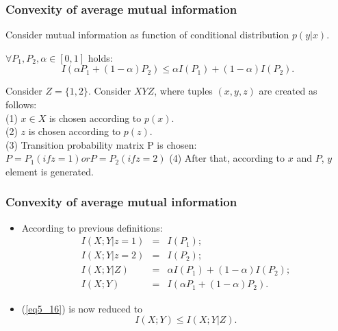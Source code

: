 \documentclass[14pt]{beamer}
\begin{document}
\begin{frame}
\frametitle{Convexity of average mutual information}
\begin{itemize}
\small{

    \item Consider mutual information as function of conditional distribution $p(y|x)$.
    
    \item $\forall P_1, P_2, \alpha \in [0,1]$ holds:
    \begin{equation}
        \label{eq5_16} I\left( {\alpha P_1 + (1 - \alpha )P_2 } \right)
        \le \alpha I(P_1 ) + (1 - \alpha )I(P_2 ).
    \end{equation}

    \item Consider $Z=\{1,2\}$. Consider $XYZ$, where tuples $(x,y,z)$ are created as follows: \\
    (1) $x \in X$ is chosen according to $p(x)$. \\
    (2) $z$ is chosen according to $p(z)$. \\
    (3) Transition probability matrix P is chosen: $P = P_1 (if z = 1 ) or P = P_2 (if z = 2)$
    (4) After that, according to $x$ and $P$, $y$ element is generated.\\
    
}    
\end{itemize}
\end{frame}



\begin{frame}
\frametitle{Convexity of average mutual information}
\begin{itemize}

    \item According to previous definitions:
    \[
    \begin{array}{lll}
    I(X;Y\vert z = 1) &=& I(P_1 );\\
    I(X;Y\vert z = 2)  &=& I(P_2 );\\
    I(X;Y\vert Z) &=& \alpha I(P_1 ) + (1 - \alpha )I(P_2 );\\
    I(X;Y) &=& I\left( {\alpha P_1 + (1 - \alpha )P_2 } \right).
    \end{array}
    \]
    
    \item (\ref{eq5_16}) is now reduced to 
    \begin{equation}
        \label{eq5_17} I(X;Y) \le I(X;Y\vert Z).
    \end{equation}
    
\end{itemize}
\end{frame}
\end{document}
